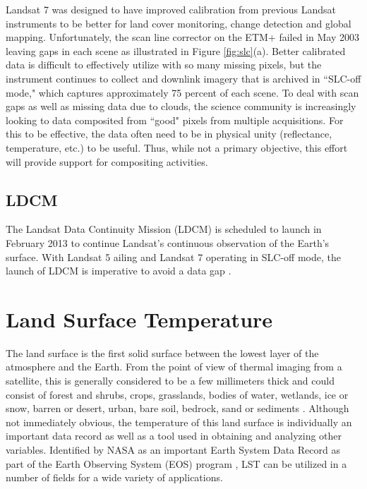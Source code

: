 \documentclass{book}
\begin{document}
Landsat 7 was designed to have improved calibration from previous Landsat instruments to be better for land cover monitoring, change detection and global mapping.  Unfortunately, the scan line corrector on the ETM+ failed in May 2003 leaving gaps in each scene as illustrated in Figure \ref{fig:slc}(a).  Better calibrated data is difficult to effectively utilize with so many missing pixels, but the instrument continues to collect and downlink imagery that is archived in ``SLC-off mode," which captures approximately 75 percent of each scene.  To deal with scan gaps as well as missing data due to clouds, the science community is increasingly looking to data composited from ``good" pixels from multiple acquisitions.  For this to be effective, the data often need to be in physical unity (reflectance, temperature, etc.) to be useful.  Thus, while not a primary objective, this effort will provide support for compositing activities. 

\subsection{LDCM}
\label{sec:ldcm}

The Landsat Data Continuity Mission (LDCM) is scheduled to launch in February 2013 to continue Landsat's continuous observation of the Earth's surface.  With Landsat 5 ailing and Landsat 7 operating in SLC-off mode, the launch of LDCM is imperative to avoid a data gap \cite{landsat_usgs}.

\section{Land Surface Temperature}
\label{sec:landsurfacetemperature}

The land surface is the first solid surface between the lowest layer of the atmosphere and the Earth.  From the point of view of thermal imaging from a satellite, this is generally considered to be a few millimeters thick and could consist of forest and shrubs, crops, grasslands, bodies of water, wetlands, ice or snow, barren or desert, urban, bare soil, bedrock, sand or sediments \cite{wan_1996}.  Although not immediately obvious, the temperature of this land surface is individually an important data record as well as a tool used in obtaining and analyzing other variables.  Identified by NASA as an important Earth System Data Record as part of the Earth Observing System (EOS) program \cite{king_1999}, LST can be utilized in a number of fields for a wide variety of applications.
\end{document}
